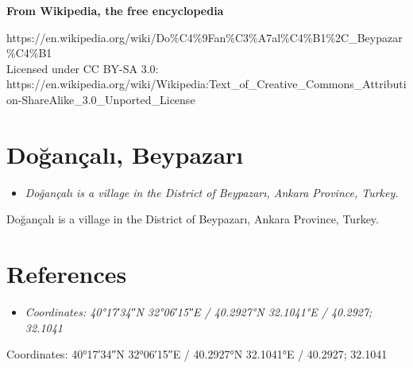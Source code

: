 \textbf{From Wikipedia, the free encyclopedia}

https://en.wikipedia.org/wiki/Do\%C4\%9Fan\%C3\%A7al\%C4\%B1\%2C\_Beypazar\%C4\%B1\\
Licensed under CC BY-SA 3.0:\\
https://en.wikipedia.org/wiki/Wikipedia:Text\_of\_Creative\_Commons\_Attribution-ShareAlike\_3.0\_Unported\_License

\section{Doğançalı, Beypazarı}\label{doux11fanuxe7alux131-beypazarux131}

\begin{itemize}
\item
  \emph{Doğançalı is a village in the District of Beypazarı, Ankara
  Province, Turkey.}
\end{itemize}

Doğançalı is a village in the District of Beypazarı, Ankara Province,
Turkey.

\section{References}\label{references}

\begin{itemize}
\item
  \emph{Coordinates: 40°17′34″N 32°06′15″E﻿ / ﻿40.2927°N 32.1041°E﻿ /
  40.2927; 32.1041}
\end{itemize}

Coordinates: 40°17′34″N 32°06′15″E﻿ / ﻿40.2927°N 32.1041°E﻿ / 40.2927;
32.1041
